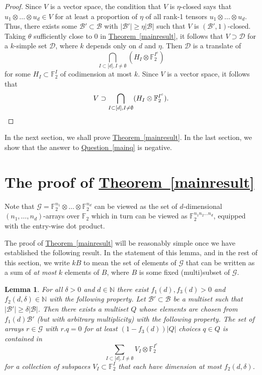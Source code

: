 \documentclass[11pt]{article}
\numberwithin{equation}{section}
\newtheorem{lemma}[theorem]{Lemma}
\theoremstyle{definition}
\theoremstyle{plain}
\newcommand{\N}{\mathbb N}
\newcommand{\expref}[2]{\hyperref[#2]{#1~\ref{#2}}}
\newcommand\F{\mathbb{F}}
\renewcommand\d{\delta}
\newcommand \cB{\mathcal B}
\newcommand \cD{\mathcal D}
\newcommand \cG{\mathcal G}
\newcommand \s{\subset}
\begin{document}
\begin{proof}
  Since $V$ is a vector space, the condition that $V$ is $\eta$-closed says that $u_1\otimes \dots \otimes u_d\in V$ for at least a proportion of $\eta$ of all rank-1 tensors $u_1\otimes \dots \otimes u_d$. Thus, there exists some $\cB'\s \cB$ with $|\cB'|\geq \eta |\cB|$ such that $V$ is $(\cB',1)$-closed. Taking $\theta$ sufficiently close to $0$ in \expref{Theorem}{mainresult}, it follows that $V\supset \cD$ for a $k$-simple set $\cD$, where $k$ depends only on $d$ and $\eta$. Then $\cD$ is a translate of
  \[
    \bigcap_{I\s \lbrack d\rbrack,I\neq \emptyset}(H_I\otimes \F_2^{I^c})
  \]
  for some $H_I\s \F_2^{I}$ of codimension at most $k$. Since $V$ is a
  vector space, it follows that
  \[
    V\supset \bigcap_{I\s \lbrack d\rbrack,I\neq \emptyset}(H_I\otimes
    \F_2^{I^c}). \qedhere
  \]
\end{proof}

\noindent In the next section, we shall prove \expref{Theorem}{mainresult}. In the last section, we show that the answer to \expref{Question}{mainq} is negative.


\section{The proof of \expref{Theorem}{mainresult}}

Note that $\cG=\F_2^{n_1}\otimes\dots\otimes\F_2^{n_d}$ can be viewed as the set of $d$-dimensional $(n_1,\dots,n_d)$-arrays over $\F_2$ which in turn can be viewed as $\F_2^{n_1n_2\dots n_d}$, equipped with the entry-wise dot product.

The proof of \expref{Theorem}{mainresult} will be reasonably simple once we have established the following result. In the statement of this lemma, and in the rest of this section, we write $kB$ to mean the set of elements of $\cG$ that can be written as a sum of \textit{at most} $k$ elements of $B$, where $B$ is some fixed (multi)subset of $\cG$.

\begin{lemma} \label{mainlemma}
  For all $\d>0$ and $d\in\N$ there exist $f_1(d),f_3(d)>0$ and $f_2(d,\d)\in\N$ with the following property. Let $\cB'\subset \cB$ be a multiset such that $|\cB'|\geq \d |\cB|$. Then there exists a multiset $Q$ whose elements are chosen from $f_1(d)\cB'$ (but with arbitrary multiplicity) with the following property. The set of arrays $r\in \cG$ with $r.q=0$ for at least $(1-f_3(d))|Q|$ choices $q\in Q$ is contained in
  \[
    \sum_{I\subset \lbrack d\rbrack, I\neq \emptyset} V_I\otimes \F_2^{I^c}
  \]
  for a collection of subspaces $V_I\subset \F_2^{I}$ that each have
  dimension at most $f_2(d,\d)$.
\end{lemma}
\end{document}
